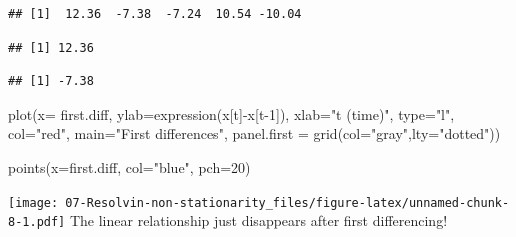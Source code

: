 \documentclass[
]{book}
\newenvironment{Shaded}{\begin{snugshade}}{\end{snugshade}}
\newcommand{\AttributeTok}[1]{\textcolor[rgb]{0.77,0.63,0.00}{#1}}
\newcommand{\DecValTok}[1]{\textcolor[rgb]{0.00,0.00,0.81}{#1}}
\newcommand{\FunctionTok}[1]{\textcolor[rgb]{0.00,0.00,0.00}{#1}}
\newcommand{\NormalTok}[1]{#1}
\newcommand{\SpecialCharTok}[1]{\textcolor[rgb]{0.00,0.00,0.00}{#1}}
\newcommand{\StringTok}[1]{\textcolor[rgb]{0.31,0.60,0.02}{#1}}
\theoremstyle{definition}
\theoremstyle{definition}
\theoremstyle{definition}
\theoremstyle{definition}
\theoremstyle{remark}
\begin{document}
\begin{verbatim}
## [1]  12.36  -7.38  -7.24  10.54 -10.04
\end{verbatim}

\begin{Shaded}
\end{Shaded}

\begin{verbatim}
## [1] 12.36
\end{verbatim}

\begin{Shaded}
\end{Shaded}

\begin{verbatim}
## [1] -7.38
\end{verbatim}

\begin{Shaded}
\begin{Highlighting}[]
\FunctionTok{plot}\NormalTok{(}\AttributeTok{x=}\NormalTok{ first.diff, }\AttributeTok{ylab=}\FunctionTok{expression}\NormalTok{(x[t]}\SpecialCharTok{{-}}\NormalTok{x[t}\DecValTok{{-}1}\NormalTok{]), }\AttributeTok{xlab=}\StringTok{"t (time)"}\NormalTok{, }\AttributeTok{type=}\StringTok{"l"}\NormalTok{, }\AttributeTok{col=}\StringTok{"red"}\NormalTok{, }\AttributeTok{main=}\StringTok{"First differences"}\NormalTok{, }\AttributeTok{panel.first =} \FunctionTok{grid}\NormalTok{(}\AttributeTok{col=}\StringTok{"gray"}\NormalTok{,}\AttributeTok{lty=}\StringTok{"dotted"}\NormalTok{))}

\FunctionTok{points}\NormalTok{(}\AttributeTok{x=}\NormalTok{first.diff, }\AttributeTok{col=}\StringTok{"blue"}\NormalTok{, }\AttributeTok{pch=}\DecValTok{20}\NormalTok{)}
\end{Highlighting}
\end{Shaded}

\texttt{[image: 07-Resolvin-non-stationarity\_files/figure-latex/unnamed-chunk-8-1.pdf]}
The linear relationship just disappears after first differencing!
\end{document}
